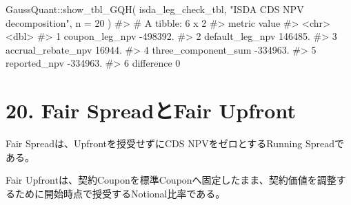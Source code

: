 \documentclass[
  letterpaper,
  DIV=11,
  numbers=noendperiod]{scrreprt}
\newenvironment{Shaded}{\begin{snugshade}}{\end{snugshade}}
\newcommand{\AttributeTok}[1]{\textcolor[rgb]{0.40,0.45,0.13}{#1}}
\newcommand{\CommentTok}[1]{\textcolor[rgb]{0.37,0.37,0.37}{#1}}
\newcommand{\DecValTok}[1]{\textcolor[rgb]{0.68,0.00,0.00}{#1}}
\newcommand{\FunctionTok}[1]{\textcolor[rgb]{0.28,0.35,0.67}{#1}}
\newcommand{\NormalTok}[1]{\textcolor[rgb]{0.00,0.23,0.31}{#1}}
\newcommand{\SpecialCharTok}[1]{\textcolor[rgb]{0.37,0.37,0.37}{#1}}
\newcommand{\StringTok}[1]{\textcolor[rgb]{0.13,0.47,0.30}{#1}}
\begin{document}
\begin{Shaded}
\begin{Highlighting}[]
\NormalTok{GaussQuant}\SpecialCharTok{::}\FunctionTok{show\_tbl\_GQH}\NormalTok{(}
\NormalTok{  isda\_leg\_check\_tbl,}
  \StringTok{"ISDA CDS NPV decomposition"}\NormalTok{,}
  \AttributeTok{n =} \DecValTok{20}
\NormalTok{)}
\CommentTok{\#\textgreater{} \# A tibble: 6 x 2}
\CommentTok{\#\textgreater{}   metric                 value}
\CommentTok{\#\textgreater{}   \textless{}chr\textgreater{}                  \textless{}dbl\textgreater{}}
\CommentTok{\#\textgreater{} 1 coupon\_leg\_npv      {-}498392.}
\CommentTok{\#\textgreater{} 2 default\_leg\_npv      146485.}
\CommentTok{\#\textgreater{} 3 accrual\_rebate\_npv    16944.}
\CommentTok{\#\textgreater{} 4 three\_component\_sum {-}334963.}
\CommentTok{\#\textgreater{} 5 reported\_npv        {-}334963.}
\CommentTok{\#\textgreater{} 6 difference                0}
\end{Highlighting}
\end{Shaded}

\section{20. Fair SpreadとFair
Upfront}\label{fair-spreadux3068fair-upfront}

Fair Spreadは、Upfrontを授受せずにCDS NPVをゼロとするRunning
Spreadである。

Fair
Upfrontは、契約Couponを標準Couponへ固定したまま、契約価値を調整するために開始時点で授受するNotional比率である。
\end{document}
